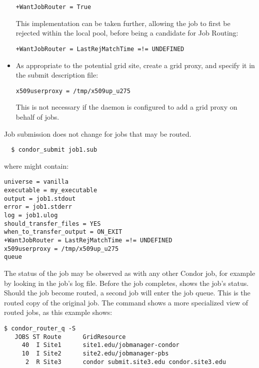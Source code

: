 \begin{itemize}
\begin{verbatim}
+WantJobRouter = True
\end{verbatim}

This implementation can be taken further,
allowing the job to first be rejected within the local pool,
before being a candidate for Job Routing:

\begin{verbatim}
+WantJobRouter = LastRejMatchTime =!= UNDEFINED
\end{verbatim}

\item As appropriate to the potential grid site,
create a grid proxy, and specify it in the submit description file:

\begin{verbatim}
x509userproxy = /tmp/x509up_u275
\end{verbatim}

This is not necessary if the  daemon is configured
to add a grid proxy on behalf of jobs.

\end{itemize}

Job submission does not change for jobs that may be routed.

\begin{verbatim}
  $ condor_submit job1.sub
\end{verbatim}

where  might contain:

\begin{verbatim}
universe = vanilla
executable = my_executable
output = job1.stdout
error = job1.stderr
log = job1.ulog
should_transfer_files = YES
when_to_transfer_output = ON_EXIT
+WantJobRouter = LastRejMatchTime =!= UNDEFINED
x509userproxy = /tmp/x509up_u275
queue
\end{verbatim}

The status of the job may be observed as with any other Condor job,
for example by looking in the job's log file.
Before the job completes,
 shows the job's status.
Should the job become routed,
a second job will enter the job queue.
This is the routed copy of the original job.
The command  shows a more specialized view of routed jobs, 
as this example shows:

\begin{verbatim}
$ condor_router_q -S
   JOBS ST Route      GridResource
     40  I Site1      site1.edu/jobmanager-condor
     10  I Site2      site2.edu/jobmanager-pbs
      2  R Site3      condor submit.site3.edu condor.site3.edu
\end{verbatim}

